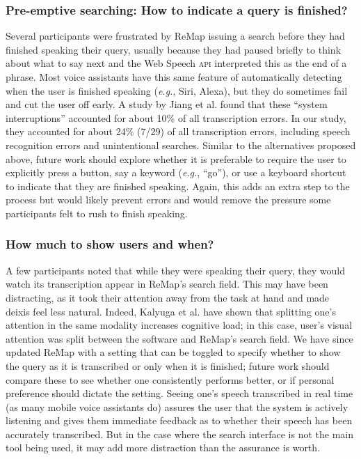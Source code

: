 \subsubsection{Pre-emptive searching: How to indicate a query is finished?}
Several participants were frustrated by ReMap issuing a search before they had finished speaking their query, usually because they had paused briefly to think about what to say next and the Web Speech \textsc{api} interpreted this as the end of a phrase. Most voice assistants have this same feature of automatically detecting when the user is finished speaking (\textit{e.g.}, Siri, Alexa), but they do sometimes fail and cut the user off early. A study by Jiang et al. \cite{Jiang2013} found that these ``system interruptions'' accounted for about 10\% of all transcription errors. In our study, they accounted for about 24\% (7/29) of all transcription errors, including speech recognition errors and unintentional searches. Similar to the alternatives proposed above, future work should explore whether it is preferable to require the user to explicitly press a button, say a keyword (\textit{e.g.}, ``go''), or use a keyboard shortcut to indicate that they are finished speaking. Again, this adds an extra step to the process but would likely prevent errors and would remove the pressure some participants felt to rush to finish speaking.

\subsubsection{How much to show users and when?}
A few participants noted that while they were speaking their query, they would watch its transcription appear in ReMap's search field. This may have been distracting, as it took their attention away from the task at hand and made deixis feel less natural. Indeed, Kalyuga et al. \cite{Kalyuga1999} have shown that splitting one's attention in the same modality increases cognitive load; in this case, user's visual attention was split between the software and ReMap's search field. We have since updated ReMap with a setting that can be toggled to specify whether to show the query as it is transcribed or only when it is finished; future work should compare these to see whether one consistently performs better, or if personal preference should dictate the setting. Seeing one's speech transcribed in real time (as many mobile voice assistants do) assures the user that the system is actively listening and gives them immediate feedback as to whether their speech has been accurately transcribed. But in the case where the search interface is not the main tool being used, it may add more distraction than the assurance is worth. 

